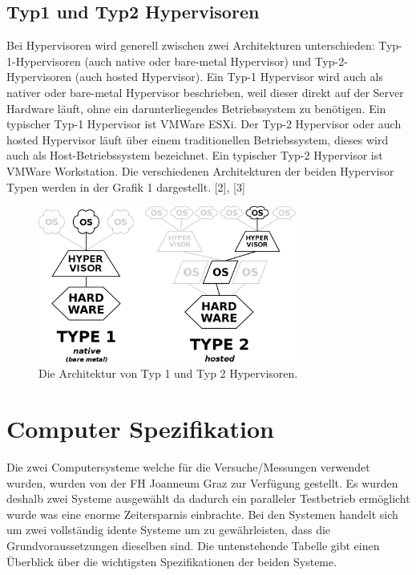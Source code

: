 \documentclass[conference]{IEEEtran}
\begin{document}
\subsection{Typ1 und Typ2 Hypervisoren}
Bei Hypervisoren wird generell zwischen zwei Architekturen unterschieden: Typ-1-Hypervisoren (auch native oder bare-metal Hypervisor) und Typ-2-Hypervisoren (auch hosted Hypervisor). Ein Typ-1 Hypervisor wird auch als nativer oder bare-metal Hypervisor beschrieben, weil dieser direkt auf der Server Hardware läuft, ohne ein darunterliegendes Betriebssystem zu benötigen. Ein typischer Typ-1 Hypervisor ist VMWare ESXi. Der Typ-2 Hypervisor oder auch hosted Hypervisor läuft über einem traditionellen Betriebssystem, dieses wird auch als Host-Betriebssystem bezeichnet. Ein typischer Typ-2 Hypervisor ist VMWare Workstation. Die verschiedenen Architekturen der beiden Hypervisor Typen werden in der Grafik 1 dargestellt. [2], [3] 

\begin{figure}[!h]
	\centering
	\includegraphics[keepaspectratio,width=8.5cm,height=0.75\textheight]{hypervisors.png}
	\caption{Die Architektur von Typ 1 und Typ 2 Hypervisoren.}
	\label{architecture}
\end{figure}

\section{Computer Spezifikation}
\label{Computer Spezifikation}
Die zwei Computersysteme welche für die Versuche/Messungen verwendet wurden, wurden von der FH Joanneum Graz zur Verfügung gestellt. Es wurden deshalb zwei Systeme ausgewählt da dadurch ein paralleler Testbetrieb ermöglicht wurde was eine enorme Zeitersparnis einbrachte. Bei den Systemen handelt sich um zwei vollständig idente Systeme um zu gewährleisten, dass die Grundvoraussetzungen dieselben sind. Die untenstehende Tabelle gibt einen Überblick über die wichtigsten Spezifikationen der beiden Systeme.
\end{document}
